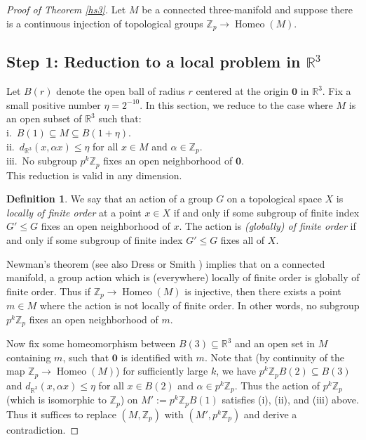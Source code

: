 \documentclass[12pt]{article}
\theoremstyle{plain}
\theoremstyle{definition}
\newtheorem{definition}[theorem]{Definition}
\theoremstyle{remark}
\numberwithin{equation}{section}
\begin{document}
\begin{proof}[Proof of Theorem \ref{hs3}]

Let $M$ be a connected three-manifold and suppose there is a continuous injection of topological groups $\mathbb Z_p\to\operatorname{Homeo}(M)$.

\subsection{Step 1: Reduction to a local problem in $\mathbb R^3$}\label{localsec}

Let $B(r)$ denote the open ball of radius $r$ centered at the origin $\mathbf 0$ in $\mathbb R^3$.  Fix a small positive number $\eta=2^{-10}$.  In this section, we reduce to the case where $M$ is an open subset of $\mathbb R^3$ such that:\\
\indent i.\ $B(1)\subseteq M\subseteq B(1+\eta)$.\\
\indent ii.\ $d_{\mathbb R^3}(x,\alpha x)\leq\eta$ for all $x\in M$ and $\alpha\in\mathbb Z_p$.\\
\indent iii.\ No subgroup $p^k\mathbb Z_p$ fixes an open neighborhood of $\mathbf 0$.\\
This reduction is valid in any dimension.

\begin{definition}
We say that an action of a group $G$ on a topological space $X$ is \emph{locally of finite order} at a point $x\in X$ if and only if some subgroup of finite index $G'\leq G$ fixes an open neighborhood of $x$.  The action is \emph{(globally) of finite order} if and only if some subgroup of finite index $G'\leq G$ fixes all of $X$.
\end{definition}

Newman's theorem \cite[p6 Theorem 2]{newman} (see also Dress \cite[p204 Theorem 1]{dress} or Smith \cite{smith}) implies that on a connected manifold, a group action which is (everywhere) locally of finite order is globally of finite order.  Thus if $\mathbb Z_p\to\operatorname{Homeo}(M)$ is injective, then there exists a point $m\in M$ where the action is not locally of finite order.  In other words, no subgroup $p^k\mathbb Z_p$ fixes an open neighborhood of $m$.

Now fix some homeomorphism between $B(3)\subseteq\mathbb R^3$ and an open set in $M$ containing $m$, such that $\mathbf 0$ is identified with $m$.  Note that (by continuity of the map $\mathbb Z_p\to\operatorname{Homeo}(M)$) for sufficiently large $k$, we have $p^k\mathbb Z_pB(2)\subseteq B(3)$ and $d_{\mathbb R^3}(x,\alpha x)\leq\eta$ for all $x\in B(2)$ and $\alpha\in p^k\mathbb Z_p$.  Thus the action of $p^k\mathbb Z_p$ (which is isomorphic to $\mathbb Z_p$) on $M':=p^k\mathbb Z_pB(1)$ satisfies (i), (ii), and (iii) above.  Thus it suffices to replace $(M,\mathbb Z_p)$ with $(M',p^k\mathbb Z_p)$ and derive a contradiction.


\end{proof}
\end{document}
